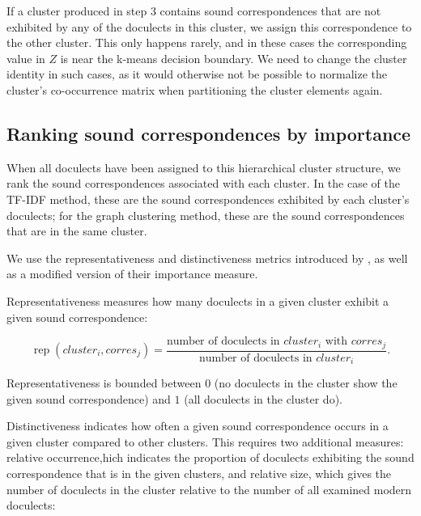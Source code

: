 \documentclass[a4paper]{article}
\begin{document}

If a cluster produced in step 3 contains
sound correspondences that are not exhibited
by any of the doculects in this cluster,
we assign this correspondence to the other cluster.
This only happens rarely, and in these cases the corresponding
value in $Z$ is near the k-means decision boundary.
We need to change the cluster identity in such cases,
as it would otherwise not be possible to normalize
the cluster's co-occurrence matrix when partitioning
the cluster elements again.

\subsection{Ranking sound correspondences by importance}
\label{subsec:ranking}

When all doculects have been assigned to this hierarchical cluster structure,
we rank the sound correspondences associated with each cluster.
In the case of the TF-IDF method, these are
the sound correspondences exhibited by each cluster's doculects;
for the graph clustering method,
these are the sound correspondences that are in the same cluster.

We use the representativeness and distinctiveness metrics
introduced by \citet{wieling2011bipartite},
as well as a modified version of their importance measure.

Representativeness measures how many doculects in a given cluster
exhibit a given sound correspondence:

\begin{equation*}
\operatorname{rep}(cluster_i, corres_j) = 
\frac{\text{number of doculects in } cluster_i \text{ with }  corres_j}
{\text{number of doculects in }  cluster_i}
.
\end{equation*}

Representativeness is bounded between
$0$ (no doculects in the cluster show the given sound correspondence)
and $1$ (all doculects in the cluster do).

Distinctiveness indicates how often a given sound correspondence
occurs in a given cluster compared to other clusters. 
This requires two additional measures:
relative occurrence,hich indicates the proportion
of doculects exhibiting the sound correspondence
that is in the given clusters,
and relative size, which gives the number of doculects 
in the cluster relative to the number of all examined modern doculects:
\end{document}
